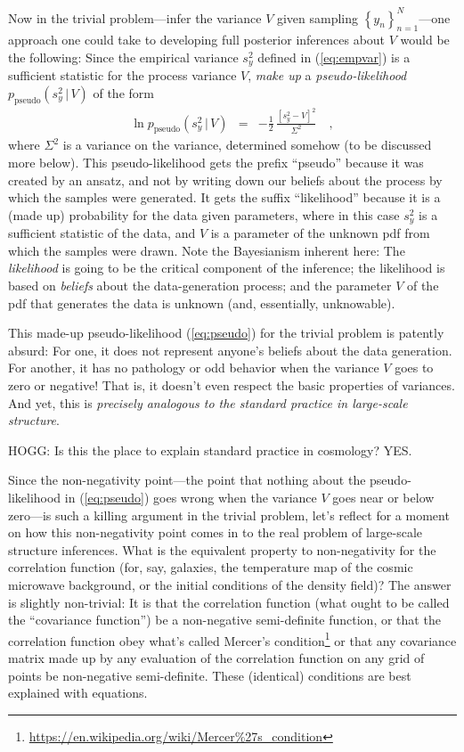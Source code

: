 \documentclass[12pt, letterpaper, preprint]{aastex}
\newcommand{\setof}[1]{\left\{{#1}\right\}}
\newcommand{\given}{\,|\,}
\newcommand{\pseudo}{{\mathrm{pseudo}}}
\begin{document}
Now in the trivial problem---infer the variance $V$ given sampling
$\setof{y_n}_{n=1}^N$---one approach one could take to developing full
posterior inferences about $V$ would be the following:
Since the empirical variance $s^2_y$ defined in (\ref{eq:empvar})
is a sufficient statistic for the process variance $V$, \emph{make up}
a \emph{pseudo-likelihood} $p_\pseudo(s^2_y\given V)$ of the form
\begin{eqnarray}
\ln p_\pseudo(s^2_y\given V) &=& -\frac{1}{2}\,\frac{[s^2_y - V]^2}{\Sigma^2}
\label{eq:pseudo}\quad ,
\end{eqnarray}
where $\Sigma^2$ is a variance on the variance, determined somehow (to
be discussed more below).
This pseudo-likelihood gets the prefix ``pseudo'' because it was
created by an ansatz, and not by writing down our beliefs about the
process by which the samples were generated.
It gets the suffix ``likelihood'' because it is a (made up)
probability for the data given parameters, where in this case
$s^2_y$ is a sufficient statistic of the data, and $V$ is a
parameter of the unknown pdf from which the samples were drawn.
Note the Bayesianism inherent here:
The \emph{likelihood} is going to be the critical component of the
inference; the likelihood is based on \emph{beliefs} about the
data-generation process; and the parameter $V$ of the pdf that
generates the data is unknown (and, essentially, unknowable).

This made-up pseudo-likelihood (\ref{eq:pseudo}) for the trivial
problem is patently absurd: For one, it does not represent anyone's
beliefs about the data generation.
For another, it has no pathology or odd behavior when the variance $V$
goes to zero or negative!
That is, it doesn't even respect the basic properties of variances.
And yet, this is \emph{precisely analogous to the standard practice in
  large-scale structure}.

HOGG: Is this the place to explain standard practice in cosmology? YES.

Since the non-negativity point---the point that nothing about the
pseudo-likelihood in (\ref{eq:pseudo}) goes wrong when the variance
$V$ goes near or below zero---is such a killing argument in the
trivial problem, let's reflect for a moment on how this non-negativity
point comes in to the real problem of large-scale structure
inferences.
What is the equivalent property to non-negativity for the correlation
function (for, say, galaxies, the temperature map of the cosmic
microwave background, or the initial conditions of the density field)?
The answer is slightly non-trivial:
It is that the correlation function (what ought to be called the
``covariance function'') be a non-negative semi-definite function, or
that the correlation function obey what's called Mercer's condition\footnote{\url{https://en.wikipedia.org/wiki/Mercer\%27s_condition}}
or that any covariance matrix made up by any evaluation of the
correlation function on any grid of points be non-negative
semi-definite.
These (identical) conditions are best explained with equations.
\end{document}
